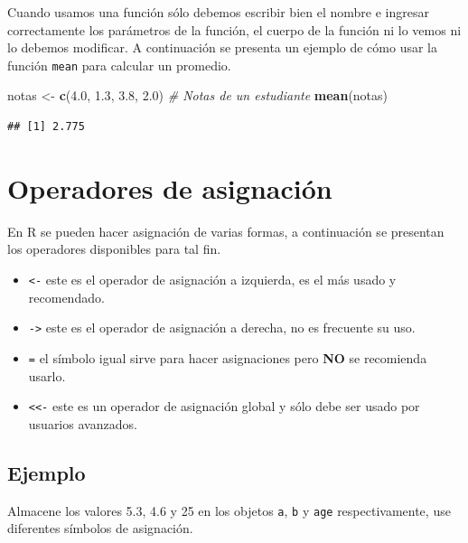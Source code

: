\documentclass[10pt,]{krantz}
\makeatletter
\newenvironment{Shaded}{\begin{snugshade}}{\end{snugshade}}
\newcommand{\KeywordTok}[1]{\textcolor[rgb]{0.13,0.29,0.53}{\textbf{#1}}}
\newcommand{\FloatTok}[1]{\textcolor[rgb]{0.00,0.00,0.81}{#1}}
\newcommand{\StringTok}[1]{\textcolor[rgb]{0.31,0.60,0.02}{#1}}
\newcommand{\CommentTok}[1]{\textcolor[rgb]{0.56,0.35,0.01}{\textit{#1}}}
\newcommand{\NormalTok}[1]{#1}
\providecommand{\tightlist}{%
  \setlength{\itemsep}{0pt}\setlength{\parskip}{0pt}}
\let\proglang=\textsf
\newenvironment{kframe}{%
\medskip{}
\setlength{\fboxsep}{.8em}
 \def\at@end@of@kframe{}%
 \ifinner\ifhmode%
  \def\at@end@of@kframe{\end{minipage}}%
  \begin{minipage}{\columnwidth}%
 \fi\fi%
 \def\FrameCommand##1{\hskip\@totalleftmargin \hskip-\fboxsep
 \colorbox{shadecolor}{##1}\hskip-\fboxsep
     \hskip-\linewidth \hskip-\@totalleftmargin \hskip\columnwidth}%
 \MakeFramed {\advance\hsize-\width
   \@totalleftmargin\z@ \linewidth\hsize
   \@setminipage}}%
 {\par\unskip\endMakeFramed%
 \at@end@of@kframe}
\renewenvironment{Shaded}{\begin{kframe}}{\end{kframe}}
\makeatother
\begin{document}
Cuando usamos una función sólo debemos escribir bien el nombre e
ingresar correctamente los parámetros de la función, el cuerpo de la
función ni lo vemos ni lo debemos modificar. A continuación se presenta
un ejemplo de cómo usar la función \texttt{mean} para calcular un
promedio.

\begin{Shaded}
\begin{Highlighting}[]
\NormalTok{notas <-}\StringTok{ }\KeywordTok{c}\NormalTok{(}\FloatTok{4.0}\NormalTok{, }\FloatTok{1.3}\NormalTok{, }\FloatTok{3.8}\NormalTok{, }\FloatTok{2.0}\NormalTok{)  }\CommentTok{# Notas de un estudiante}
\KeywordTok{mean}\NormalTok{(notas)}
\end{Highlighting}
\end{Shaded}

\begin{verbatim}
## [1] 2.775
\end{verbatim}

\section{\texorpdfstring{Operadores de asignación
}{Operadores de asignación }}\label{operadores-de-asignacion}

En \proglang{R} se pueden hacer asignación de varias formas, a
continuación se presentan los operadores disponibles para tal fin.

\begin{itemize}
\tightlist
\item
  \texttt{\textless{}-} este es el operador de asignación a izquierda,
  es el más usado y recomendado.
\item
  \texttt{-\textgreater{}} este es el operador de asignación a derecha,
  no es frecuente su uso.
\item
  \texttt{=} el símbolo igual sirve para hacer asignaciones pero
  \textbf{NO} se recomienda usarlo.
\item
  \texttt{\textless{}\textless{}-} este es un operador de asignación
  global y sólo debe ser usado por usuarios avanzados.
\end{itemize}

\subsection*{Ejemplo}\label{ejemplo-5}


Almacene los valores 5.3, 4.6 y 25 en los objetos \texttt{a}, \texttt{b}
y \texttt{age} respectivamente, use diferentes símbolos de asignación.
\end{document}
